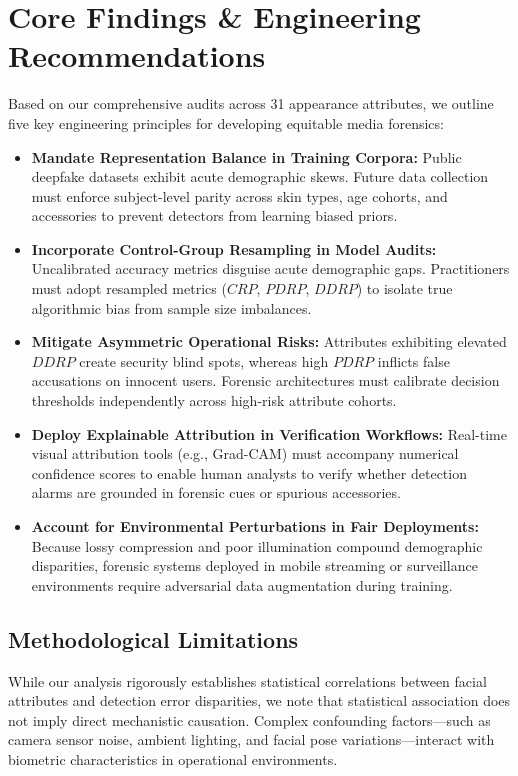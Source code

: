 \documentclass[journal]{IEEEtran}
\begin{document}
\section{Core Findings \& Engineering Recommendations}
\label{sec:findings}
Based on our comprehensive audits across 31 appearance attributes, we outline five key engineering principles for developing equitable media forensics:
\begin{itemize}
    \item \textbf{Mandate Representation Balance in Training Corpora:} Public deepfake datasets exhibit acute demographic skews. Future data collection must enforce subject-level parity across skin types, age cohorts, and accessories to prevent detectors from learning biased priors.
    \item \textbf{Incorporate Control-Group Resampling in Model Audits:} Uncalibrated accuracy metrics disguise acute demographic gaps. Practitioners must adopt resampled metrics ($CRP$, $PDRP$, $DDRP$) to isolate true algorithmic bias from sample size imbalances.
    \item \textbf{Mitigate Asymmetric Operational Risks:} Attributes exhibiting elevated $DDRP$ create security blind spots, whereas high $PDRP$ inflicts false accusations on innocent users. Forensic architectures must calibrate decision thresholds independently across high-risk attribute cohorts.
    \item \textbf{Deploy Explainable Attribution in Verification Workflows:} Real-time visual attribution tools (e.g., Grad-CAM) must accompany numerical confidence scores to enable human analysts to verify whether detection alarms are grounded in forensic cues or spurious accessories.
    \item \textbf{Account for Environmental Perturbations in Fair Deployments:} Because lossy compression and poor illumination compound demographic disparities, forensic systems deployed in mobile streaming or surveillance environments require adversarial data augmentation during training.
\end{itemize}

\subsection{Methodological Limitations}
While our analysis rigorously establishes statistical correlations between facial attributes and detection error disparities, we note that statistical association does not imply direct mechanistic causation. Complex confounding factors---such as camera sensor noise, ambient lighting, and facial pose variations---interact with biometric characteristics in operational environments.
\end{document}
